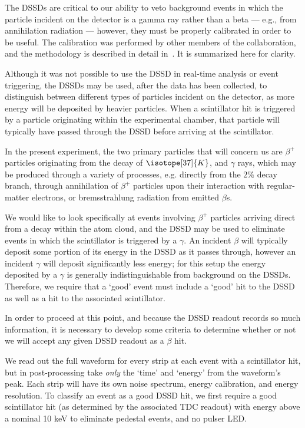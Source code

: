 The DSSDs are critical to our ability to veto background events in which the particle incident on the detector is a gamma ray rather than a beta --- e.g., from annihilation radiation --- however, they must be properly calibrated in order to be useful.  The calibration was performed by other members of the collaboration, and the methodology is described in detail in~\cite{ben_thesis}.  It is summarized here for clarity.

Although it was not possible to use the DSSD in real-time analysis or event triggering, the DSSDs may be used, after the data has been collected, to distinguish between different types of particles incident on the detector, as more energy will be deposited by heavier particles.  When a scintillator hit is triggered by a particle originating within the experimental chamber, that particle will typically have passed through the DSSD before arriving at the scintillator.

In the present experiment, the two primary particles that will concern us are $\beta^+$ particles originating from the decay of $\isotope[37]{K}$, and $\gamma$ rays, which may be produced through a variety of processes, e.g. directly from the $2\%$ decay branch, through annihilation of $\beta^+$ particles upon their interaction with regular-matter electrons, or bremsstrahlung radiation from emitted $\beta$s.  

We would like to look specifically at events involving $\beta^+$ particles arriving direct from a decay within the atom cloud, and the DSSD may be used to eliminate events in which the scintillator is triggered by a $\gamma$.  An incident $\beta$ will typically deposit some portion of its energy in the DSSD as it passes through, however an incident $\gamma$ will deposit significantly less energy; for this setup the energy deposited by a $\gamma$ is generally indistinguishable from background on the DSSDs.  Therefore, we require that a `good' event must include a `good' hit to the DSSD as well as a hit to the associated scintillator.   

In order to proceed at this point, and because the DSSD readout records so much information, it is necessary to develop some criteria to determine whether or not we will accept any given DSSD readout as a $\beta$ hit.



We read out the full waveform for every strip at each event with a scintillator hit, but in post-processing take \emph{only} the `time' and `energy' from the waveform's peak.
Each strip will have its own noise spectrum, energy calibration, and energy resolution.  To classify an event as a good DSSD hit, we first require a good scintillator hit (as determined by the associated TDC readout) with energy above a nominal 10 keV to eliminate pedestal events, and no pulser LED.

